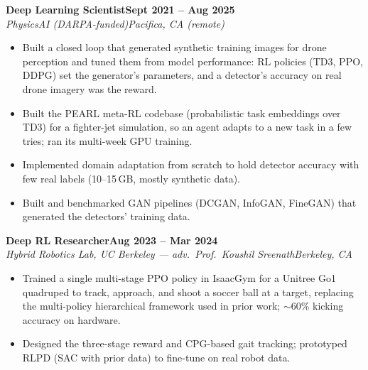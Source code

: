 \documentclass[10pt]{article}
\newcommand{\role}[4]{\textbf{#1}\hfill\textbf{#2}\\\textit{#3}\hfill\textit{#4}}
\begin{document}
\role{Deep Learning Scientist}{Sept 2021 -- Aug 2025}{PhysicsAI (DARPA-funded)}{Pacifica, CA (remote)}
\begin{itemize}
\item Built a closed loop that generated synthetic training images for drone perception and tuned them from model performance: RL policies (TD3, PPO, DDPG) set the generator's parameters, and a detector's accuracy on real drone imagery was the reward.
\item Built the PEARL meta-RL codebase (probabilistic task embeddings over TD3) for a fighter-jet simulation, so an agent adapts to a new task in a few tries; ran its multi-week GPU training.
\item Implemented domain adaptation from scratch to hold detector accuracy with few real labels (10--15\,GB, mostly synthetic data).
\item Built and benchmarked GAN pipelines (DCGAN, InfoGAN, FineGAN) that generated the detectors' training data.
\end{itemize}

\role{Deep RL Researcher}{Aug 2023 -- Mar 2024}{Hybrid Robotics Lab, UC Berkeley --- adv.\ Prof.\ Koushil Sreenath}{Berkeley, CA}
\begin{itemize}
\item Trained a single multi-stage PPO policy in IsaacGym for a Unitree Go1 quadruped to track, approach, and shoot a soccer ball at a target, replacing the multi-policy hierarchical framework used in prior work; $\sim$60\% kicking accuracy on hardware.
\item Designed the three-stage reward and CPG-based gait tracking; prototyped RLPD (SAC with prior data) to fine-tune on real robot data.
\end{itemize}
\end{document}
